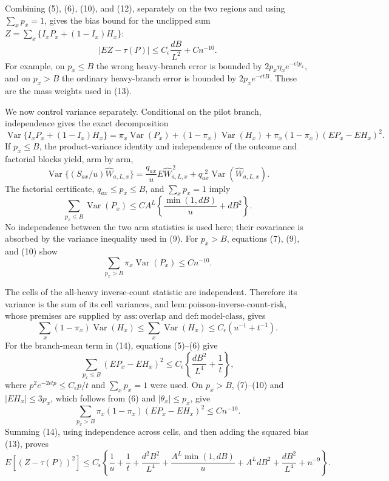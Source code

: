 Combining (5), (6), (10), and (12), separately on the two regions and
using \(\sum_xp_x=1\), gives the bias bound for the unclipped sum
\(Z=\sum_x\{I_xP_x+(1-I_x)H_x\}\):
\[
 |EZ-\tau(P)|\le C_\epsilon\frac{dB}{L^2}+Cn^{-10}.                \tag{13}
\]
For example, on \(p_x\le B\) the wrong heavy-branch error is bounded
by \(2p_x\eta_xe^{-\epsilon tp_x}\), and on \(p_x>B\) the ordinary
heavy-branch error is bounded by \(2p_xe^{-\epsilon tB}\).  These are
the mass weights used in (13).

We now control variance separately.  Conditional on the pilot branch,
independence gives the exact decomposition
\[
 \operatorname{Var}\{I_xP_x+(1-I_x)H_x\}
 =\pi_x\operatorname{Var}(P_x)+(1-\pi_x)\operatorname{Var}(H_x)
  +\pi_x(1-\pi_x)(EP_x-EH_x)^2.                 \tag{14}
\]
If \(p_x\le B\), the product-variance identity and independence of the
outcome and factorial blocks yield, arm by arm,
\[
 \operatorname{Var}\{(S_{ax}/u)\widehat W_{a,L,x}\}
 =\frac{q_{ax}}uE\widehat W_{a,L,x}^{\,2}
  +q_{ax}^{,2}\operatorname{Var}(\widehat W_{a,L,x}).             \tag{15}
\]
The factorial certificate, \(q_{ax}\le p_x\le B\), and
\(\sum_xp_x=1\) imply
\[
 \sum_{p_x\le B}\operatorname{Var}(P_x)
 \le C A^L\left\{\frac{\min(1,dB)}u+dB^2\right\}.                \tag{16}
\]
No independence between the two arm statistics is used here; their
covariance is absorbed by the variance inequality used in (9).
For \(p_x>B\), equations (7), (9), and (10) show
\[
 \sum_{p_x>B}\pi_x\operatorname{Var}(P_x)\le Cn^{-10}.           \tag{17}
\]

The cells of the all-heavy inverse-count statistic are independent.
Therefore its variance is the sum of its cell variances, and
\(\mathrm{lem:poisson\mbox{-}inverse\mbox{-}count\mbox{-}risk}\),
whose premises are supplied by \(\mathrm{ass:overlap}\) and
\(\mathrm{def:model\mbox{-}class}\), gives
\[
 \sum_x(1-\pi_x)\operatorname{Var}(H_x)
 \le\sum_x\operatorname{Var}(H_x)
 \le C_\epsilon(u^{-1}+t^{-1}).                 \tag{18}
\]
For the branch-mean term in (14), equations (5)--(6) give
\[
 \sum_{p_x\le B}(EP_x-EH_x)^2
 \le C_\epsilon\left\{\frac{dB^2}{L^4}+\frac1t\right\},         \tag{19}
\]
where \(p^2e^{-2\epsilon tp}\le C_\epsilon p/t\) and
\(\sum_xp_x=1\) were used.  On \(p_x>B\), (7)--(10) and
\(|EH_x|\le3p_x\), which follows from (6) and \(|\theta_x|\le p_x\),
give
\[
 \sum_{p_x>B}\pi_x(1-\pi_x)(EP_x-EH_x)^2\le Cn^{-10}.            \tag{20}
\]
Summing (14), using independence across cells, and then adding the
squared bias (13), proves
\[
 E[(Z-\tau(P))^2]\le C_\epsilon\left\{
 \frac1u+\frac1t+\frac{d^2B^2}{L^4}
 +\frac{A^L\min(1,dB)}u+A^LdB^2
 +\frac{dB^2}{L^4}+n^{-9}\right\}.              \tag{21}
\]

